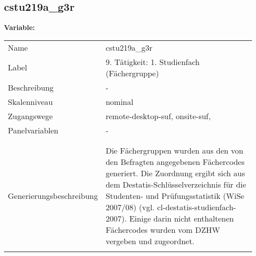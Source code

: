 	
	
	\subsection{cstu219a\_g3r}
	\label{subSection:cstu219a_g3r}

	\noindent\textbf{Variable:}\\
		\begin{tabular}{lL{11.3cm}}
			\label{tableVariable:cstu219a_g3r}
			Name & cstu219a\_g3r \\
			Label & 9. Tätigkeit: 1. Studienfach (Fächergruppe) \\
			Beschreibung & - \\
			Skalenniveau & nominal \\
			Zugangswege &
				remote-desktop-suf,
				onsite-suf,
 \\
			Panelvariablen & -
			 \\
			 \\
 \\
					Generierungsbeschreibung & Die Fächergruppen wurden aus den von den Befragten angegebenen Fächercodes generiert. Die Zuordnung ergibt sich aus dem Destatis-Schlüsselverzeichnis für die Studenten- und Prüfungsstatistik (WiSe 2007/08) (vgl. cl-destatis-studienfach-2007).  Einige darin nicht enthaltenen Fächercodes wurden vom DZHW vergeben und zugeordnet. 
				 \\	
			 \\
		\end{tabular}






